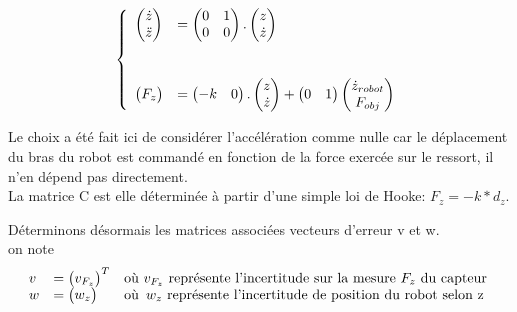 \documentclass[12pt,twoside,a4paper]{article}
\begin{document}
$$
\left\{ 
\begin{array}{ll}
        \begin{pmatrix} \dot{z} \\ \ddot{z} \end{pmatrix} 
        &= \begin{pmatrix}
        0 & 1 \\
        0 & 0 \\ 
        \end{pmatrix}.
        \begin{pmatrix} z  \\ \dot{z} \end{pmatrix} \\
        \vspace{0.5cm} \\
        \begin{pmatrix} F_z  \end{pmatrix}
         &= \begin{pmatrix} -k & 0 \end{pmatrix}.
	 	\begin{pmatrix} z \\  \dot{z} \end{pmatrix} 
	+ \begin{pmatrix} 0 & 1 \end{pmatrix}
	 \begin{pmatrix} \dot{z}_{robot} \\ F_{obj}\end{pmatrix}\\
\end{array}
\right.
$$

Le choix a été fait ici de considérer l'accélération comme nulle car le déplacement du bras du robot est commandé en fonction de la force exercée sur le ressort, il n'en dépend pas directement.
\\
La matrice C est elle déterminée à partir d'une simple loi de Hooke: $F_z = -k*d_z$. 

\vspace{2cm}

Déterminons désormais les  matrices associées vecteurs d'erreur v et w. \\
on note 
$$
\begin{array}{lll}
 v &= \begin{pmatrix}  v_{F_{z}}  \end{pmatrix} ^T  & \text{où $v_{F_{z}}$ représente l'incertitude sur la mesure $F_z$ du capteur} \\
 w &= \begin{pmatrix} w_z  \end{pmatrix}&
 		\text{où}
		\begin{array}[t]{l}
		\text{$w_z$ représente l'incertitude de position du robot selon z} \\
		\end{array} \\
 \end{array}
 $$
 
\end{document}
